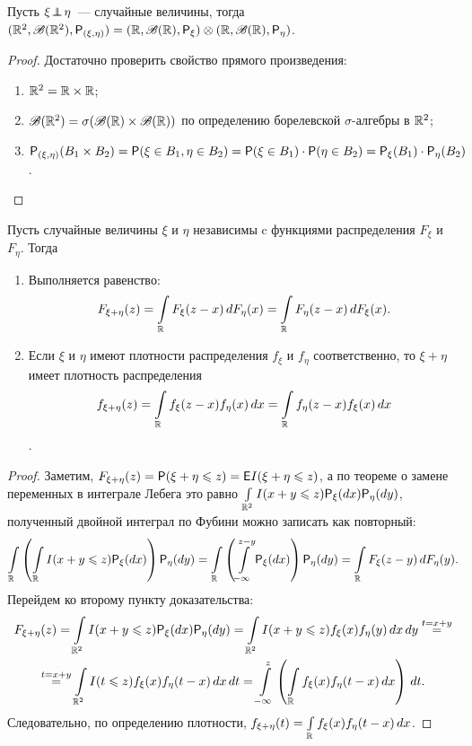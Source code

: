 \begin{statement}
 	Пусть $\xi \indep \eta$~--- случайные величины, тогда $(\R^2, \B(\R^2), \P_{(\xi, \eta)}) = (\R, \B(\R), \P_\xi) \otimes (\R, \B(\R), \P_\eta)$.
 	\begin{proof} Достаточно проверить свойство прямого произведения:
 		\begin{enumerate}
 			\item $\R^2 = \R \times \R$;
 			\item $\B(\R^2) = \sigma(\B(\R) \times \B(\R))$ по определению борелевской $\sigma$-алгебры в $\R^2$;
 			\item $\P_{(\xi, \eta)} (B_1 \times B_2) = \P(\xi \in B_1, \eta \in B_2) = \P(\xi \in B_1) \cdot \P(\eta \in B_2) = \P_\xi(B_1) \cdot \P_\eta (B_2)$. \qedhere
 		\end{enumerate}
 	\end{proof}
\end{statement}

\begin{lemma}[о свертке]
	Пусть случайные величины $\xi$ и $\eta$ независимы c функциями распределения $F_\xi$ и $F_\eta$. Тогда
	\begin{enumerate}
	    \item Выполняется равенство: $$ F_{\xi + \eta} (z) = \int\limits_\R F_\xi (z - x) \, dF_\eta (x) = \int\limits_\R F_\eta(z - x) \, d F_\xi(x).$$
	    \item Если $\xi$ и $\eta$ имеют плотности распределения $f_\xi$ и $f_\eta$ соответственно, то $\xi + \eta$ имеет плотность распределения $$f_{\xi + \eta} (z) = \int\limits_\R f_\xi (z - x) f_\eta (x) \, dx = \int\limits_\R f_\eta (z - x) f_\xi(x) \, dx$$.
	\end{enumerate} 
	
	\begin{proof}
		Заметим, $F_{\xi + \eta} (z) = \P ( \xi + \eta \leqslant z) = \E I(\xi + \eta \leqslant z)$, а по теореме о замене переменных в интеграле Лебега это равно $\int\limits_{\R^2} I(x + y \leqslant z) \P_\xi(dx) \P_\eta(dy)$, полученный двойной интеграл по Фубини можно записать как повторный:
		$$ \int\limits_\R \left( \int\limits_\R I(x + y \leqslant z) \P_\xi(dx) \right) \P_\eta(dy) = \int\limits_\R \left( \int\limits_{-\infty}^{z-y} \P_\xi(dx) \right) \P_\eta(dy) = \int\limits_\R F_\xi(z - y) \, dF_\eta(y).$$
		Перейдем ко второму пункту доказательства:
		\begin{multline*}
			F_{\xi + \eta} (z) = \int\limits_{\R^2} I(x + y \leqslant z) \P_\xi(dx) \P_\eta(dy) = \int\limits_{\R^2} I(x + y \leqslant z) f_\xi(x) f_\eta(y) \, dx\,dy \overset{t = x+y}{=} \\ \overset{t = x+y}{=} \int\limits_{\R^2} I(t \leqslant z) f_\xi(x) f_\eta(t - x) \, dx\,dt = \int\limits_{-\infty}^z \left( \int\limits_\R f_\xi(x) f_\eta(t-x) \, dx \right) \, dt.
		\end{multline*}
		Следовательно, по определению плотности, $f_{\xi+\eta}(t) = \int\limits_\R f_\xi(x) f_\eta(t-x) \, dx$.
	\end{proof}
\end{lemma}

